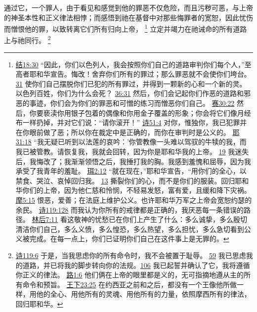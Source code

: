 \documentclass[12pt, a4paper, oneside]{ctexart}
\newcounter{parnum}[section]
\newcommand{\N}{%
   \noindent\refstepcounter{parnum}%
    \makebox[\parindent][l]{\textbf{\arabic{parnum}.}}}
\begin{document}
\N 通过它，一个罪人，由于看见和感觉到他的罪恶不仅危险，而且污秽可恶，与上帝的神圣本性和正义律法相悖；而感悟到祂在基督中对那些悔罪者的宽恕，因此忧伤而憎恨他的罪，以致转离它们所有归向上帝，
	\footnote {
		\href{https://biblehub.com/ezekiel/18-30.htm}{结18:30} “因此，你们以色列人，我会按照你们自己的道路审判你们每个人，”至高者耶和华宣告。悔改！舍弃你们所有的罪过；那么罪恶就不会使你们垮台。
		\href{https://biblehub.com/ezekiel/18-31.htm}{31} 使你们自己摆脱你们已犯的所有罪过，并得到一颗新的心和一个新的灵。以色列百姓，你们为什么会死？
		\href{https://biblehub.com/ezekiel/36-31.htm}{36:31} 然后，你们会记起你们作恶的道路和邪恶的事迹，你们会为你们的罪恶和可憎的练习而憎恶你们自己。
		\href{https://biblehub.com/isaiah/30-22.htm}{赛30:22} 然后，你要亵渎你用银子包着的偶像和你用金子覆盖的形象；你会将它们像月经布一样扔掉，并对它们说：“请你滚开！”
		\href{https://biblehub.com/psalms/51-4.htm}{诗51:4} 对你，惟独你，我已犯罪并在你眼前做了恶；所以你在裁定中是正确的，而你在审判时是公义的。
		\href{https://biblehub.com/jeremiah/31-18.htm}{耶31:18} “我无疑已听到以法莲的哀吟：'你管教像一头难以驾驭的牛犊的我，而我已被管教。请恢复我，我就会回转，因为你是耶和华我的上帝。
		\href{https://biblehub.com/jeremiah/31-19.htm}{19} 我迷失后，我悔改了；我渐渐领悟之后，我捶打我的胸。我感到羞愧和屈辱，因为我承受了我青年的羞耻。
		\href{https://biblehub.com/joel/2-12.htm}{珥2:12} “就在现在，”耶和华宣告，“用你们的全心，以禁食、哭泣、哀悼回归我。
		\href{https://biblehub.com/joel/2-13.htm}{13} 撕裂你们的心，而不是你们的服装。回归耶和华你们的上帝，因为他仁慈和怜悯，不轻易发怒，富有爱，且缓和降下灾祸。
		\href{https://biblehub.com/amos/5-15.htm}{摩5:15} 恨恶，爱善；在法庭上维护公义。也许耶和华万军之上帝会宽恕约瑟的余民。
		\href{https://biblehub.com/psalms/119-128.htm}{诗119:128} 而我认为你所有的戒律都是正确的，我厌恶每一条错误的路径。
		\href{https://biblehub.com/2_corinthians/7-11.htm}{林后7:11} 看这敬神的忧愁已在你们上产生了什么：多么诚挚，多么殷切清洁你们自己，多么义愤，多么惶恐，多么热望，多么担忧，多么急切看到公义被完成。在每一点上，你们已证明你们自己在这件事上是无罪的。
	}
	立定并竭力在祂诫命的所有道路上与祂同行。
	\footnote {
		\href{https://biblehub.com/psalms/119-6.htm}{诗119:6} 于是，当我思虑你的所有命令时，我不会被置于耻辱。
		\href{https://biblehub.com/psalms/119-59.htm}{59} 我已思虑我的道路，并已将我的脚步转向你的法规。\href{https://biblehub.com/psalms/119-106.htm}{106} 我已起誓并确认了它，我将遵循你正义的律法。
		\href{https://biblehub.com/luke/1-6.htm}{路1:6} 他们俩在上帝的眼里都是义的，无可指摘地遵从主的所有命令和预旨。
		\href{https://biblehub.com/2_kings/23-25.htm}{王下23:25} 在约西亚之前和之后，都没有一个王像他所做一样，用他的全心、用他所有的灵魂、用他所有的力量，依照摩西所有的律法，回归耶和华。
	}
\end{document}
